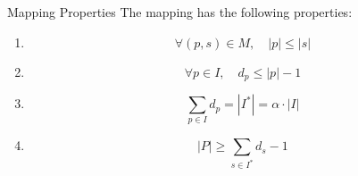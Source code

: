 \begin{frame}{Mapping Properties}
The mapping has the following properties:
\begin{enumerate}

\item<1->
$$\forall (p, s) \in M, \quad |p| \leq |s|$$

\item<2->
$$\forall p \in I, \quad d_p \leq |p| - 1$$

\item<3->
$$\sum_{p \in I}{d_p} = |I^*| = \alpha \cdot |I|$$

\item<4->
$$|P| \geq \sum_{s \in I^*}{d_s - 1}$$

\end{enumerate}
\end{frame}